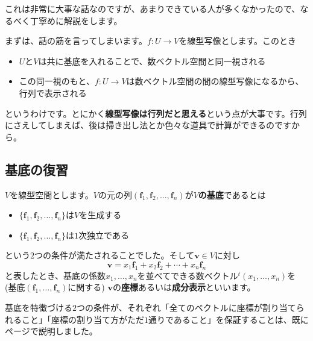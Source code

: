 これは非常に大事な話なのですが、あまりできている人が多くなかったので、なるべく丁寧めに解説をします。

まずは、話の筋を言ってしまいます。$f\colon U\rightarrow V$を線型写像とします。このとき
\begin{itemize}
\item $U$と$V$は共に基底を入れることで、数ベクトル空間と同一視される
\item この同一視のもと、$f\colon U\rightarrow V$は数ベクトル空間の間の線型写像になるから、行列で表示される
\end{itemize}
というわけです。とにかく\textbf{線型写像は行列だと思える}という点が大事です。行列にさえしてしまえば、後は掃き出し法とか色々な道具で計算ができるのですから。

\subsection{基底の復習}

$V$を線型空間とします。$V$の元の列$(\bm{f}_1, \bm{f}_2, \ldots, \bm{f}_n)$が\textbf{$V$の基底}であるとは
\begin{itemize}
\item $\{\bm{f}_1, \bm{f}_2, \ldots, \bm{f}_n\}$は$V$を生成する
\item $\{\bm{f}_1, \bm{f}_2, \ldots, \bm{f}_n\}$は$1$次独立である
\end{itemize}
という$2$つの条件が満たされることでした。そして$\bm{v} \in V$に対し
\[
\bm{v} = x_1 \bm{f}_1 + x_2 \bm{f}_2 + \cdots + x_n \bm{f}_n
\]
と表したとき、基底の係数$x_1, \ldots, x_n$を並べてできる数ベクトル${}^t(x_1, \ldots, x_n)$を  (基底$(\bm{f}_1, \ldots, \bm{f}_n)$に関する) $\bm{v}$の\textbf{座標}あるいは\textbf{成分表示}といいます。

基底を特徴づける$2$つの条件が、それぞれ「全てのベクトルに座標が割り当てられること」「座標の割り当て方がただ$1$通りであること」を保証することは、既に\pageref{subsec:basis}ページで説明しました。

